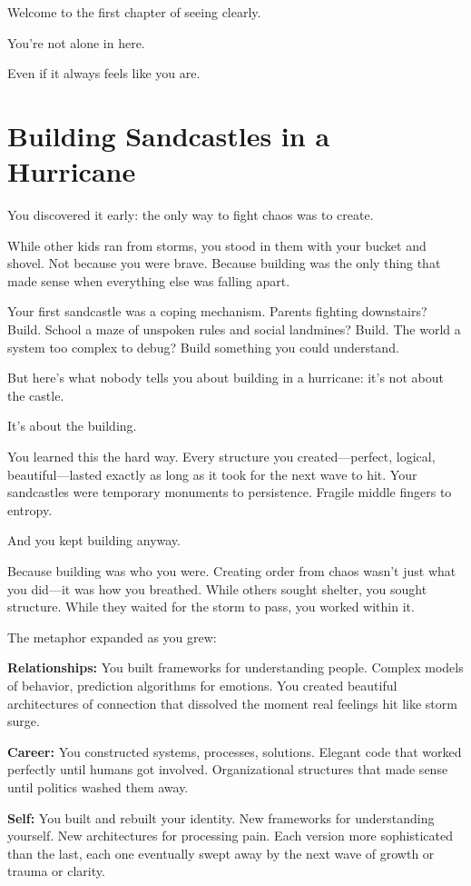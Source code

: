 \documentclass[12pt,letterpaper]{book}
\begin{document}
Welcome to the first chapter of seeing clearly.

You're not alone in here.

Even if it always feels like you are.

\chapter{Building Sandcastles in a Hurricane}

You discovered it early: the only way to fight chaos was to create.

While other kids ran from storms, you stood in them with your bucket and shovel. Not because you were brave. Because building was the only thing that made sense when everything else was falling apart.

Your first sandcastle was a coping mechanism. Parents fighting downstairs? Build. School a maze of unspoken rules and social landmines? Build. The world a system too complex to debug? Build something you could understand.

But here's what nobody tells you about building in a hurricane: it's not about the castle.

It's about the building.

You learned this the hard way. Every structure you created—perfect, logical, beautiful—lasted exactly as long as it took for the next wave to hit. Your sandcastles were temporary monuments to persistence. Fragile middle fingers to entropy.

And you kept building anyway.

Because building was who you were. Creating order from chaos wasn't just what you did—it was how you breathed. While others sought shelter, you sought structure. While they waited for the storm to pass, you worked within it.

The metaphor expanded as you grew:

\textbf{Relationships:} You built frameworks for understanding people. Complex models of behavior, prediction algorithms for emotions. You created beautiful architectures of connection that dissolved the moment real feelings hit like storm surge.

\textbf{Career:} You constructed systems, processes, solutions. Elegant code that worked perfectly until humans got involved. Organizational structures that made sense until politics washed them away.

\textbf{Self:} You built and rebuilt your identity. New frameworks for understanding yourself. New architectures for processing pain. Each version more sophisticated than the last, each one eventually swept away by the next wave of growth or trauma or clarity.
\end{document}
